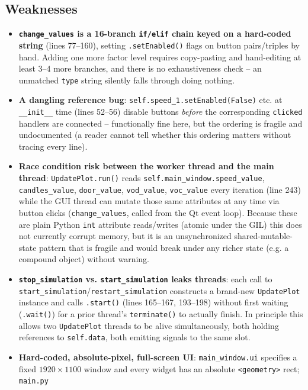 \documentclass[11pt,a4paper]{report}
\begin{document}
\subsection{Weaknesses}
\begin{itemize}[nosep]
\item \textbf{\texttt{change\_values} is a 16-branch \texttt{if/elif} chain keyed on a hard-coded
string} (lines 77--160), setting \texttt{.setEnabled()} flags on button pairs/triples by hand. Adding
one more factor level requires copy-pasting and hand-editing at least 3--4 more branches, and there is
no exhaustiveness check -- an unmatched \texttt{type} string silently falls through doing nothing.
\item \textbf{A dangling reference bug}: \texttt{self.speed\_1.setEnabled(False)} etc. at
\texttt{\_\_init\_\_} time (lines 52--56) disable buttons \emph{before} the corresponding
\texttt{clicked} handlers are connected -- functionally fine here, but the ordering is fragile and
undocumented (a reader cannot tell whether this ordering matters without tracing every line).
\item \textbf{Race condition risk between the worker thread and the main thread}: \texttt{UpdatePlot.run()}
reads \texttt{self.main\_window.speed\_value}, \texttt{candles\_value}, \texttt{door\_value},
\texttt{vod\_value}, \texttt{voc\_value} every iteration (line 243) while the GUI thread can mutate
those same attributes at any time via button clicks (\texttt{change\_values}, called from the Qt event
loop). Because these are plain Python \texttt{int} attribute reads/writes (atomic under the GIL) this
does not currently corrupt memory, but it is an unsynchronized shared-mutable-state pattern that is
fragile and would break under any richer state (e.g. a compound object) without warning.
\item \textbf{\texttt{stop\_simulation} vs. \texttt{start\_simulation} leaks threads}: each call to
\texttt{start\_simulation}/\texttt{restart\_simulation} constructs a brand-new \texttt{UpdatePlot}
instance and calls \texttt{.start()} (lines 165--167, 193--198) without first waiting
(\texttt{.wait()}) for a prior thread's \texttt{terminate()} to actually finish. In principle this
allows two \texttt{UpdatePlot} threads to be alive simultaneously, both holding references to
\texttt{self.data}, both emitting signals to the same slot.
\item \textbf{Hard-coded, absolute-pixel, full-screen UI}: \texttt{main\_window.ui} specifies a fixed
$1920\times1100$ window and every widget has an absolute \texttt{<geometry>} rect; \texttt{main.py}

\end{itemize}
\end{document}
